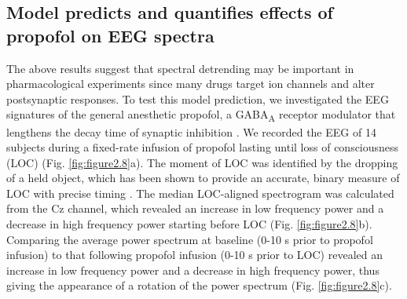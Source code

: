 \subsection{Model predicts and quantifies effects of propofol on EEG spectra}
The above results suggest that spectral detrending may be important in pharmacological experiments since many drugs target ion channels and alter postsynaptic responses. To test this model prediction, we investigated the EEG signatures of the general anesthetic propofol, a GABA\textsubscript{A} receptor modulator that lengthens the decay time of synaptic inhibition \cite{Franks2008, Kitamura2003, Orser1994, Whittington1996}. We recorded the EEG of 14 subjects during a fixed-rate infusion of propofol lasting until loss of consciousness (LOC) (Fig. \ref{fig:figure2.8}a). The moment of LOC was identified by the dropping of a held object, which has been shown to provide an accurate, binary measure of LOC with precise timing \cite{Cummings1984,Guay2019}. The median LOC-aligned spectrogram was calculated from the Cz channel, which revealed an increase in low frequency power and a decrease in high frequency power starting before LOC (Fig. \ref{fig:figure2.8}b). Comparing the average power spectrum at baseline (0-10 \unit{\second} prior to propofol infusion) to that following propofol infusion (0-10 \unit{\second} prior to LOC) revealed an increase in low frequency power and a decrease in high frequency power, thus giving the appearance of a rotation of the power spectrum (Fig. \ref{fig:figure2.8}c). 

